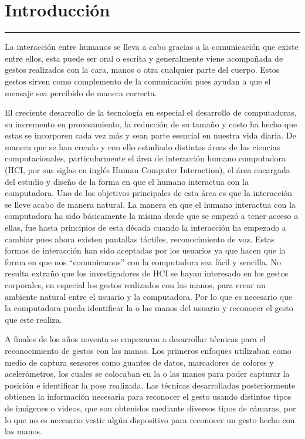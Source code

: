 \chapter{Introducci\'on}\label{capit:cap1}
\vspace{-2.0325ex}%
\noindent
\rule{\textwidth}{0.5pt}
\vspace{-5.5ex}%
\newcommand{\pushline}{\Indp}%

La interacción entre humanos se lleva a cabo gracias a la comunicación  que existe entre ellos, esta puede ser oral o escrita y generalmente viene acompañada de gestos realizados con la cara, manos o otra cualquier parte del cuerpo. 
Estos gestos sirven como complemento de la comunicación pues ayudan a que el mensaje sea percibido de manera correcta.

El creciente desarrollo de la tecnología en especial el desarrollo de computadoras, su incremento en procesamiento, la reducción de su tamaño y costo ha hecho que estas se incorporen cada vez más y sean parte esencial en nuestra vida diaria. De manera que se han creado y con ello estudiado distintas áreas de las ciencias computacionales, particularmente el área de interacción humano computadora (HCI, por sus siglas en ingl\'es Human Computer Interaction), el área encargada del estudio y diseño de la forma en que el humano interactua con la computadora. 
Uno de los objetivos principales de esta área es que la interacción se lleve acabo de manera natural. 
La manera en que el humano interactua con la computadora ha sido básicamente la misma desde que se empezó a tener acceso a ellas, fue hasta principios de esta década cuando la interacción ha empezado a cambiar pues ahora existen pantallas táctiles, reconocimiento de voz. Estas formas de interacción han sido aceptadas por los usuarios ya que hacen que la forma en que nos ``comunicamos'' con la computadora sea fácil y sencilla. No resulta extraño que los investigadores de HCI se hayan interesado en los gestos corporales, en especial los gestos realizados con las manos, para crear un ambiente natural entre el usuario y la computadora.  
Por lo que es necesario que la computadora pueda identificar la o las manos del usuario y reconocer el gesto que este realiza. 

A finales de los años noventa se empezaron a desarrollar t\'ecnicas para  el reconocimiento de gestos con las manos. Los primeros enfoques utilizaban como medio de captura sensores como guantes de datos, marcadores de colores y acelerómetros, los cuales se colocaban en la o las manos para poder capturar la posición e identificar la pose realizada. 
Las técnicas desarrolladas posteriormente obtienen la información necesaria para reconocer el gesto usando distintos tipos de imágenes o videos, que son obtenidos mediante diversos tipos de cámaras, por lo que no es necesario vestir algún dispositivo para reconocer un gesto hecho con las manos.

